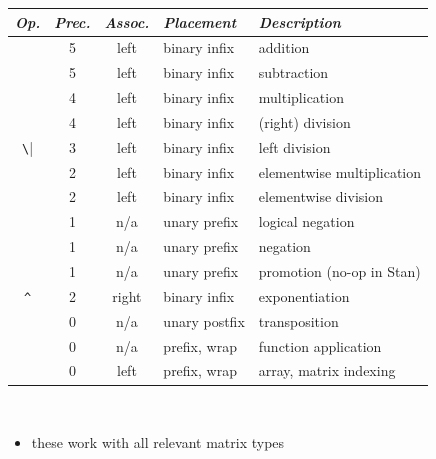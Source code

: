 \documentclass[10pt]{report}
\begin{document}
%
\vfill
\noindent\spc
{\footnotesize
  \begin{tabular}{c|ccl|l}
    {\it Op.} & {\it Prec.} & {\it Assoc.} & {\it
      Placement} & {\it Description}
    \\ \hline \hline

    \code{+} & 5 & left & binary infix & addition
    \\
    \code{-} & 5 & left & binary infix & subtraction
    \\ \hline
    \code{*} & 4 & left & binary infix & multiplication
    \\
    \code{/} & 4 & left & binary infix & (right) division
    \\ \hline
    \Verb|\| & 3 & left & binary infix & left division
    \\ \hline
    \code{.*} & 2 & left & binary infix & elementwise multiplication
    \\
    \code{./} & 2 & left & binary infix & elementwise division
    \\ \hline
    \code{!} & 1 & n/a & unary prefix & logical negation
    \\
    \code{-} & 1 & n/a & unary prefix & negation
    \\
    \code{+} & 1 & n/a & unary prefix & promotion (no-op in Stan)
    \\ \hline
    \Verb|^| & 2 & right & binary infix & exponentiation
    \\ \hline
    \code{'} & 0 & n/a & unary postfix & transposition
    \\ \hline \hline
    \code{()} & 0 & n/a & prefix, wrap & function application
    \\
    \code{[]} & 0 & left & prefix, wrap & array, matrix indexing
  \end{tabular}
}


%
\null \\
%
\begin{itemize}
\item these work with all relevant matrix types
\end{itemize}
\end{document}
